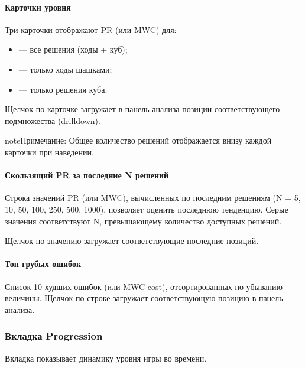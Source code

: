 \documentclass[letterpaper,10pt,russian]{sphinxmanual}
\begin{document}
\paragraph{Карточки уровня}
\label{\detokenize{manuel:cartes-de-niveau}}
\sphinxAtStartPar
Три карточки отображают PR (или MWC) для:
\begin{itemize}
\item {} 
\sphinxAtStartPar
{} — все решения (ходы + куб);

\item {} 
\sphinxAtStartPar
{} — только ходы шашками;

\item {} 
\sphinxAtStartPar
{} — только решения куба.

\end{itemize}

\sphinxAtStartPar
Щелчок по карточке загружает в панель анализа позиции соответствующего подмножества (drill\sphinxhyphen{}down).

\begin{sphinxadmonition}{note}{Примечание:}
\sphinxAtStartPar
Общее количество решений отображается внизу каждой карточки при наведении.
\end{sphinxadmonition}


\paragraph{Скользящий PR за последние N решений}
\label{\detokenize{manuel:pr-glissant-sur-n-dernieres-decisions}}
\sphinxAtStartPar
Строка значений PR (или MWC), вычисленных по последним  решениям (N = 5, 10, 50, 100, 250, 500, 1000), позволяет оценить последнюю тенденцию. Серые значения соответствуют N, превышающему количество доступных решений.

\sphinxAtStartPar
Щелчок по значению загружает соответствующие последние  позиций.


\paragraph{Топ грубых ошибок}
\label{\detokenize{manuel:top-blunders}}
\sphinxAtStartPar
Список 10 худших ошибок (или MWC cost), отсортированных по убыванию величины. Щелчок по строке загружает соответствующую позицию в панель анализа.


\subsubsection{Вкладка Progression}
\label{\detokenize{manuel:onglet-progression}}
\sphinxAtStartPar
Вкладка  показывает динамику уровня игры во времени.
\end{document}
